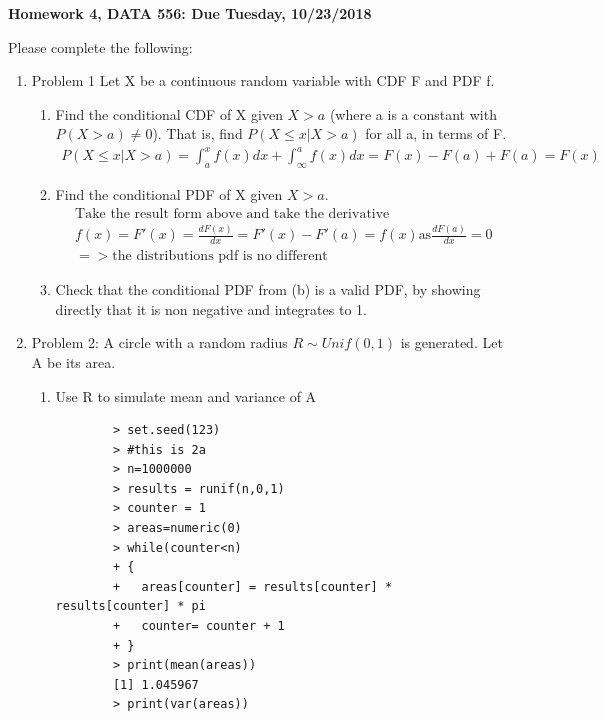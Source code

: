 \documentclass[11pt]{article}
\begin{document}
\begin{title}
	{\Large\bf Homework 4, DATA 556: Due Tuesday, 10/23/2018}
\end{title}

\author{\bf Alexander Van Roijen}

\maketitle

\newpage
Please complete the following:
\begin{enumerate}
\item Problem 1
Let X be a continuous random variable with CDF F and PDF f.
\begin{enumerate}
	\item Find the conditional CDF of X given $X > a$ (where a is a constant with $P(X>a) \ne 0$). That is, find $P(X\le x|X>a)$ for all a, in terms of F.
	\begin{gather}
	P(X \le x | X > a) = \int_{a}^{x} f(x) dx + \int_{\infty}^{a} f(x) dx = F(x) - F(a) + F(a) = F(x)
	\end{gather}
	\item Find the conditional PDF of X given $X > a$.
	\begin{gather}
		\text{Take the result form above and take the derivative }\\
		f(x) = F'(x) = \frac{dF(x)}{dx} = F'(x)-F'(a) = f(x) \text{as} \frac{dF(a)}{dx} = 0 \\
		=> \text{the distributions pdf is no different}
	\end{gather}
	\item Check that the conditional PDF from (b) is a valid PDF, by showing directly that it is non negative and integrates to 1.
\end{enumerate}
\item Problem 2: A circle with a random radius $R \sim Unif(0,1)$ is generated. Let A be its area.
\\
\begin{enumerate}
	\item Use R to simulate mean and variance of A
	\\
	\begin{verbatim}
		> set.seed(123)
		> #this is 2a
		> n=1000000
		> results = runif(n,0,1)
		> counter = 1
		> areas=numeric(0)
		> while(counter<n)
		+ {
		+   areas[counter] = results[counter] * results[counter] * pi
		+   counter= counter + 1
		+ }
		> print(mean(areas))
		[1] 1.045967
		> print(var(areas))

\end{verbatim}
\end{enumerate}
\end{enumerate}
\end{document}

